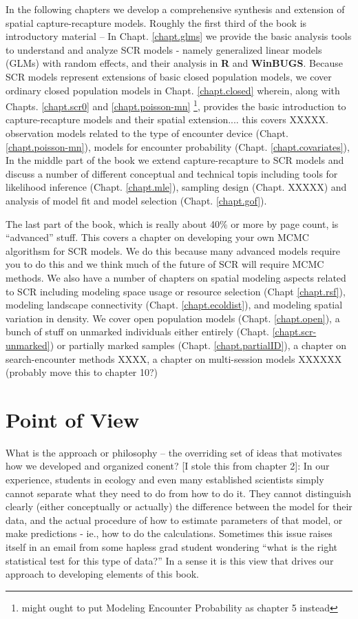 In the following chapters we develop a comprehensive synthesis and extension of
spatial capture-recapture models.
Roughly the first third of the book is introductory material --
In Chapt. \ref{chapt.glms} we provide the basic analysis tools to understand and
analyze SCR models - namely generalized linear models (GLMs) with random effects, and their
analysis in {\bf R} and {\bf WinBUGS}.  Because SCR models represent extensions of
basic closed population models, we cover ordinary closed population
models in Chapt. \ref{chapt.closed} wherein, along with Chapts. \ref{chapt.scr0} and \ref{chapt.poisson-mn}
\footnote{might ought to put Modeling Encounter Probability
  as chapter 5 instead}, provides the basic introduction
to capture-recapture models and their spatial extension.... this
covers XXXXX.
observation models related to the type of encounter device (Chapt. \ref{chapt.poisson-mn}), models for encounter probability
(Chapt. \ref{chapt.covariates}),
In the middle part of the book we extend capture-recapture to SCR models
and discuss a number of different conceptual and technical topis
including 
tools for likelihood inference (Chapt. \ref{chapt.mle}), sampling design
(Chapt. XXXXX) and analysis of model fit and model selection
(Chapt. \ref{chapt.gof}). 

The last part of the book, which is really about 40\% or more by page
count, is ``advanced'' stuff. This covers a chapter on developing your
own MCMC algorithsm for SCR models. We do this because many advanced
models require you to do this and we think much of the future of SCR
will require MCMC methods. 
We also have a number of chapters on spatial modeling aspects related
to SCR including modeling 
space usage or resource selection (Chapt \ref{chapt.rsf}), modeling
landscape connectivity (Chapt. \ref{chapt.ecoldist}), and modeling
spatial variation in density. 
We cover open population models (Chapt. \ref{chapt.open}),
a bunch of stuff on unmarked individuals either entirely (Chapt. \ref{chapt.scr-unmarked})
or partially marked samples (Chapt. \ref{chapt.partialID}), 
a chapter on search-encounter methods XXXX, a chapter on multi-session
models XXXXXX (probably move this to chapter 10?)


\section*{Point of View}
What is the approach or philosophy -- the overriding set of ideas that
motivates how we developed and organized conent?
[I stole this from chapter 2]:
In our experience, students in ecology and even many established
scientists simply cannot separate what they need to do from how to do
it.  They cannot distinguish clearly (either conceptually or actually)
the difference between the model for their data, and the actual
procedure of how to estimate parameters of that model, or make
predictions - ie., how to do the calculations. Sometimes this issue
raises itself in an email from some hapless grad student wondering
``what is the right statistical test for this type of data?''  In a
sense it is this view that drives our approach to developing elements
of this book.

